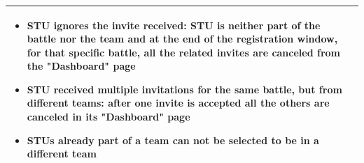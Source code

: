 \begin{center}
\begin{tabular}{| m{2cm} | m{10cm}|}
\begin{itemize}
                                    \item STU ignores the invite received: STU is neither part of the battle nor the team and at the end of the registration window, for that specific battle, all the related invites are canceled from the "Dashboard" page
                                    \item STU received multiple invitations for the same battle, but from different teams: after one invite is accepted all the others are canceled in its "Dashboard" page
                                    \item STUs already part of a team can not be selected to be in a different team
                                \end{itemize}                                                                                                                                                                                                                                   \\ \hline
    \end{tabular}
\end{center}

